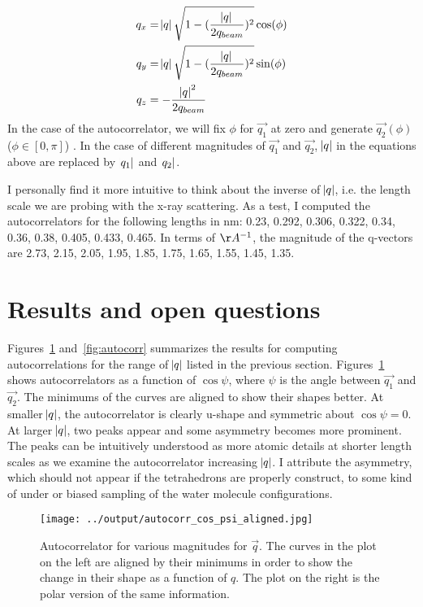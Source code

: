 \documentclass[20pt]{article}
\begin{document}
\begin{align}
q_x &= \abs{q}\sqrt{1-(\frac{\abs{q}}{2q_{beam}})^2} \cos(\phi) \\
q_y &= \abs{q}\sqrt{1-(\frac{\abs{q}}{2q_{beam}})^2} \sin(\phi) \\
q_z &= -\frac{\abs{q}^2}{2q_{beam}} 
\end{align}
In the case of the autocorrelator, we will fix $\phi$ for $\vec{q_1}$ at zero and generate $\vec{q_2}(\phi)$ ($\phi \in [0 , \pi]$) . In the case of different magnitudes of $\vec{q_1}$ and $\vec{q_2}$, $\abs{q}$ in the equations above are replaced by $\abs{q_1}$ and $\abs{q_2}$.

I personally find it more intuitive to think about the inverse of $\abs{q}$, i.e. the length scale we are probing with the x-ray scattering. As a test, I computed the autocorrelators for the following lengths in nm: 0.23, 0.292, 0.306, 0.322, 0.34, 0.36, 0.38, 0.405, 0.433, 0.465. In terms of $\AA^{-1}$, the magnitude of the q-vectors are 2.73, 2.15,  2.05, 1.95, 1.85, 1.75, 1.65, 1.55, 1.45, 1.35.

\section{Results and open questions}
Figures~\ref{fig:autocorr_aligned} and~\ref{fig:autocorr} summarizes the results for computing autocorrelations for the range of $\abs{q}$ listed in the previous section. Figures~\ref{fig:autocorr_aligned} shows autocorrelators as a function of $\cos{\psi}$, where $\psi$ is the angle between $\vec{q_1}$ and $\vec{q_2}$. The minimums of the curves are aligned to show their shapes better. At smaller $\abs{q}$, the autocorrelator is clearly u-shape and symmetric about $\cos{\psi} = 0$. At larger $\abs{q}$, two peaks appear and some asymmetry becomes more prominent. The peaks can be intuitively understood as more atomic details at shorter length scales as we examine the autocorrelator increasing $\abs{q}$. I attribute the asymmetry, which should not appear if the tetrahedrons are properly construct, to some kind of under or biased sampling of the water molecule configurations. 

\begin{figure}[!h] 
  \centering
    \texttt{[image: ../output/autocorr\_cos\_psi\_aligned.jpg]}
     \caption{Autocorrelator for various magnitudes for $\vec{q}$. The curves in the plot on the left are aligned by their minimums in order to show the change in their shape as a function of $q$. The plot on the right is the polar version of the same information.} \label{fig:autocorr_aligned}
\end{figure}
\end{document}
